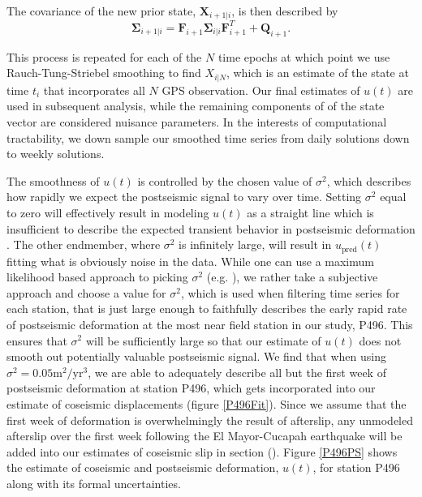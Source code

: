 \documentclass[12pt]{article}
\begin{document}
The covariance of the new prior state, $\mathbf{X}_{i+1|i}$, is then described by
\begin{equation}
  \mathbf{\Sigma}_{i+1|i} = \mathbf{F}_{i+1}\mathbf{\Sigma}_{i|i}\mathbf{F}^T_{i+1} + \mathbf{Q}_{i+1}.
\end{equation}

This process is repeated for each of the $N$ time epochs at which point we use Rauch-Tung-Striebel smoothing to find $X_{i|N}$, which is an estimate of the state at time $t_i$ that incorporates all $N$ GPS observation.  Our final estimates of $u(t)$ are used in subsequent analysis, while the remaining components of of the state vector are considered nuisance parameters. In the interests of computational tractability, we down sample our smoothed time series from daily solutions down to weekly solutions.




The smoothness of $u(t)$ is controlled by the chosen value of $\sigma^2$, which describes how rapidly we expect the postseismic signal to vary over time.  Setting $\sigma^2$ equal to zero will effectively result in modeling $u(t)$ as a straight line which is insufficient to describe the expected transient behavior in postseismic deformation \cite{Savage2005a}. The other endmember, where $\sigma^2$ is infinitely large, will result in $u_\mathrm{pred}(t)$ fitting what is obviously noise in the data. While one can use a maximum likelihood based approach to picking $\sigma^2$ (e.g. \cite{Segall1997}), we rather take a subjective approach and choose a value for $\sigma^2$, which is used when filtering time series for each station, that is just large enough to faithfully describes the early rapid rate of postseismic deformation at the most near field station in our study, P496.  This ensures that $\sigma^2$ will be sufficiently large so that our estimate of $u(t)$ does not smooth out potentially valuable postseismic signal. We find that when using $\sigma^2 = 0.05 \mathrm{m}^2 / \mathrm{yr}^3$, we are able to adequately describe all but the first week of postseismic deformation at station P496, which gets incorporated into our estimate of coseismic displacements (figure \ref{P496Fit}).  Since we assume that the first week of deformation is overwhelmingly the result of afterslip, any unmodeled afterslip over the first week following the El Mayor-Cucapah earthquake will be added into our estimates of coseismic slip in section ().  Figure \ref{P496PS} shows the estimate of coseismic and postseismic deformation, $u(t)$, for station P496 along with its formal uncertainties. 
\end{document}
